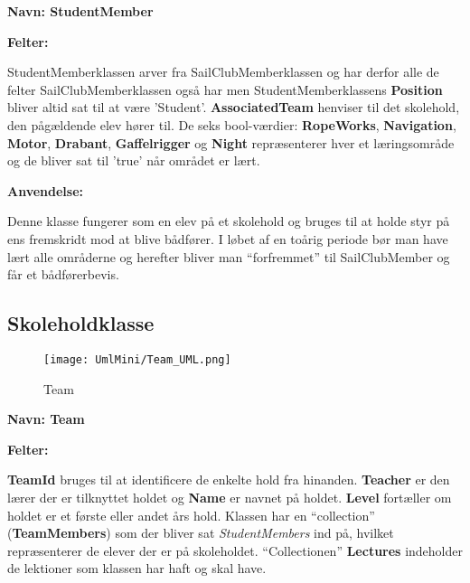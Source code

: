 \textbf{Navn: StudentMember}

\textbf{Felter:}

StudentMemberklassen arver fra SailClubMemberklassen og har derfor alle de felter SailClubMemberklassen også har men StudentMemberklassens \textbf{Position} bliver altid sat til at være 'Student'. \textbf{AssociatedTeam} henviser til det skolehold, den pågældende elev hører til. De seks bool-værdier: \textbf{RopeWorks}, \textbf{Navigation}, \textbf{Motor}, \textbf{Drabant}, \textbf{Gaffelrigger} og \textbf{Night} repræsenterer hver et læringsområde og de bliver sat til 'true' når området er lært. 

\textbf{Anvendelse:}

Denne klasse fungerer som en elev på et skolehold og bruges til at holde styr på ens fremskridt mod at blive bådfører. I løbet af en toårig periode bør man have lært alle områderne og herefter bliver man ``forfremmet'' til SailClubMember og får et bådførerbevis.


\subsection*{Skoleholdklasse}

\begin{wrapfigure}{l}{0.5\textwidth}
    \label{img:Team}
    \vspace{-20pt}
    \begin{center}
        \texttt{[image: UmlMini/Team\_UML.png]}
    \end{center}
    \vspace{-20pt}
    \caption{Team}
    \vspace{-20pt}
\end{wrapfigure}

\textbf{Navn: Team}

\textbf{Felter:}

\textbf{TeamId} bruges til at identificere de enkelte hold fra hinanden. \textbf{Teacher} er den lærer der er tilknyttet holdet og \textbf{Name} er navnet på holdet. \textbf{Level} fortæller om holdet er et første eller andet års hold. Klassen har en ``collection'' (\textbf{TeamMembers}) som der bliver sat \textit{StudentMembers} ind på, hvilket repræsenterer de elever der er på skoleholdet. ``Collectionen'' \textbf{Lectures} indeholder de lektioner som klassen har haft og skal have. 

